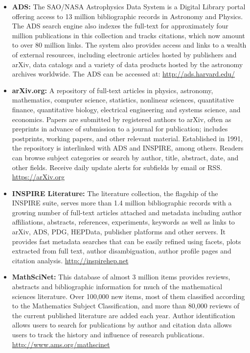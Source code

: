 \begin{itemize}
\item
  \textbf{ADS:} The SAO/NASA Astrophysics Data System is a Digital
  Library portal offering access to 13 million bibliographic records in
  Astronomy and Physics. The ADS search engine also indexes the
  full-text for approximately four million publications in this
  collection and tracks citations, which now amount to over 80 million
  links. The system also provides access and links to a wealth of
  external resources, including electronic articles hosted by publishers
  and arXiv, data catalogs and a variety of data products hosted by the
  astronomy archives worldwide. The ADS can be accessed at:
  \url{http://ads.harvard.edu/}

\item
  \textbf{arXiv.org:} A repository of full-text articles in physics,
  astronomy, mathematics, computer science, statistics, nonlinear
  sciences, quantitative finance, quantitative biology, electrical
  engineering and systems science, and economics. Papers are submitted
  by registered authors to arXiv, often as preprints in advance of
  submission to a journal for publication; includes postprints, working
  papers, and other relevant material. Established in 1991, the
  repository is interlinked with ADS and INSPIRE, among others. Readers
  can browse subject categories or search by author, title, abstract,
  date, and other fields. Receive daily update alerts for subfields by
  email or RSS. \url{https://arXiv.org}

\item
  \textbf{INSPIRE Literature:} The literature collection, the flagship of the
  INSPIRE suite, serves more than 1.4 million bibliographic records with a
  growing number of full-text articles attached and metadata including author
  affiliations, abstracts, references, experiments, keywords as well as links
  to arXiv, ADS, PDG, HEPData, publisher platforms and other servers. It
  provides fast metadata searches that can be easily refined using facets,
  plots extracted from full text, author disambiguation, author profile pages
  and citation analysis.
  \url{http://inspirehep.net}

\item
  \textbf{MathSciNet:} This database of almost 3 million items provides
  reviews, abstracts and bibliographic information for much of the
  mathematical sciences literature. Over 100,000 new items, most of them
  classified according to the Mathematics Subject Classification, and
  more than 80,000 reviews of the current published literature are added
  each year. Author identification allows users to search for
  publications by author and citation data allows users to track the
  history and influence of research publications.
  \url{http://www.ams.org/mathscinet}
\end{itemize}

